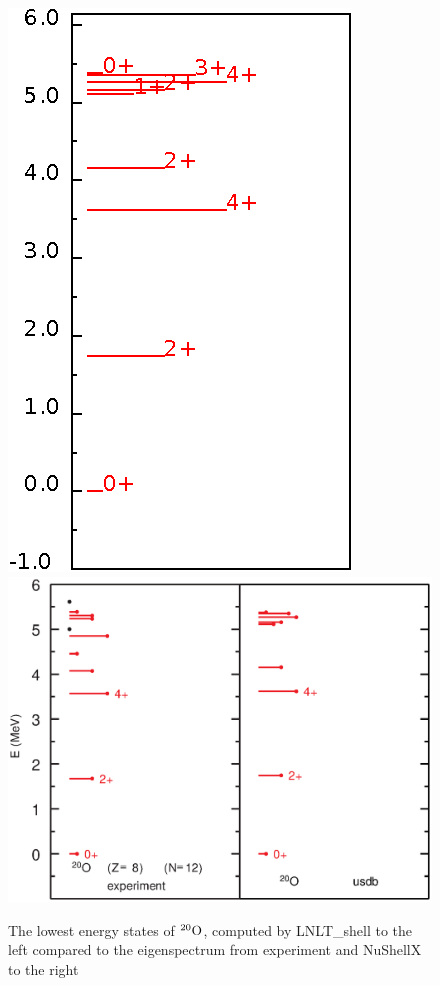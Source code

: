 \begin{figure}[ht!]
\includegraphics{ox20.eps}
\includegraphics[scale=0.56,trim=0cm 2.3cm 0cm 0cm]{o_20b.eps}
\caption{The lowest energy states of $^{20}\rm{O}$, computed by LNLT\_shell to the left compared to the eigenspectrum from experiment and NuShellX to the right}
\label{fig:ox20eig}
\end{figure}



